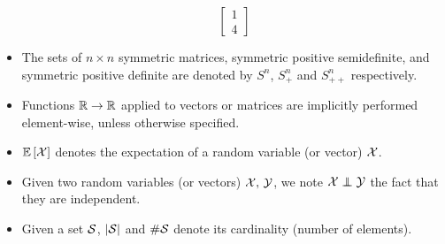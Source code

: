 \begin{itemize}
\begin{equation*}
\begin{bmatrix}
            1\\
            4
        \end{bmatrix}
    \end{equation*}
    \item The sets of $n \times n$ symmetric matrices,
        symmetric positive semidefinite,
        and symmetric positive definite
        are denoted by $S^n$, $S^n_+$ and $S^n_{++}$ respectively.
    \item Functions $\mathbb{R} \to \mathbb{R}$ applied to vectors or matrices are implicitly performed element-wise,
        unless otherwise specified.
    \item ${\mathbb E}\left[\mathcal{X}\right]$ denotes the expectation of a random variable (or vector) $\mathcal{X}$.
    \item Given two random variables (or vectors) $\mathcal{X},\, \mathcal{Y}$,
        we note $\cX \independent \cY$ the fact that they are independent.
    \item Given a set $\mathcal{S}$, $\left\lvert\mathcal{S}\right\rvert$ and $\#\mathcal{S}$ denote its cardinality (number of elements).
\end{itemize}
